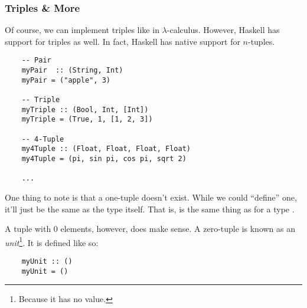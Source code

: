 \documentclass[letterpaper]{article}
\begin{document}
\subsubsection{Triples \& More}
Of course, we can implement triples like in $\lambda$-calculus. However, Haskell has support for triples as well. In fact, Haskell has native support for $n$-tuples. 
\begin{verbatim}
    -- Pair
    myPair  :: (String, Int)
    myPair = ("apple", 3)

    -- Triple 
    myTriple :: (Bool, Int, [Int])
    myTriple = (True, 1, [1, 2, 3])

    -- 4-Tuple 
    my4Tuple :: (Float, Float, Float, Float)
    my4Tuple = (pi, sin pi, cos pi, sqrt 2)

    ... \end{verbatim}
One thing to note is that a one-tuple doesn't exist. While we could ``define'' one, it'll just be the same as the type itself. That is,  is the same thing as  for a type .

\bigskip

A tuple with 0 elements, however, does make sense. A zero-tuple is known as an \emph{unit}\footnote{Because it has no value.}. It is defined like so: 
\begin{verbatim}
    myUnit :: ()
    myUnit = ()\end{verbatim}
\end{document}
